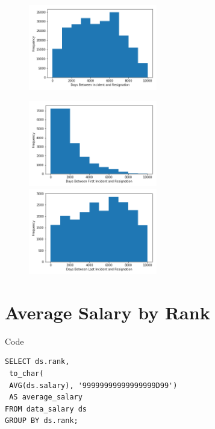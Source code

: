 \documentclass{article}
\begin{document}
\begin{figure}[h!]
\centering
\includegraphics[width=0.5\textwidth]{complaint1.png}
\end{figure}

\begin{figure}[h!]
\includegraphics[width=0.5\textwidth]{complaint2.png}
\includegraphics[width=0.5\textwidth]{complaint3.png}
\end{figure}

\FloatBarrier
\section{Average Salary by Rank}

\begin{center}
Code
\end{center} 
\begin{lstlisting}[frame=single]
SELECT ds.rank, 
 to_char(
 AVG(ds.salary), '99999999999999999D99')
 AS average_salary
FROM data_salary ds 
GROUP BY ds.rank;
\end{lstlisting}
\end{document}
